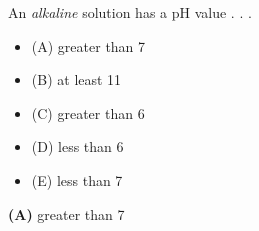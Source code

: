 

An {\it alkaline} solution has a pH value . . .

\begin{itemize}
\item{(A)} greater than 7
\vskip 5pt 
\item{(B)} at least 11
\vskip 5pt 
\item{(C)} greater than 6
\vskip 5pt 
\item{(D)} less than 6
\vskip 5pt 
\item{(E)} less than 7
\end{itemize}







{\bf (A)} greater than 7
 











